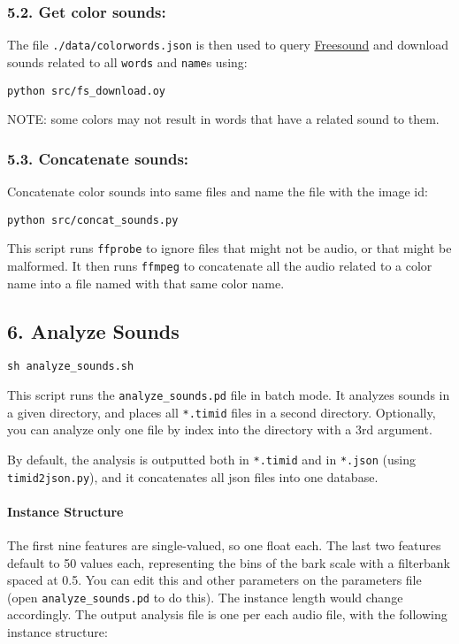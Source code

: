 \subsubsection*{5.2. Get color sounds:}

The file \texttt{./data/colorwords.json} is then used to query \href{https://freesound.org}{Freesound} and download sounds related to all \texttt{words} and \texttt{name}s using:

\texttt{python\ src/fs\_download.oy}

NOTE: some colors may not result in words that have a related sound to them.


\subsubsection*{5.3. Concatenate sounds:}

Concatenate color sounds into same files and name the file with the image id:

\texttt{python\ src/concat\_sounds.py}

This script runs \texttt{ffprobe} to ignore files that might not be audio, or that might be malformed. It then runs \texttt{ffmpeg} to concatenate all the audio related to a color name into a file named with that same color name.




\subsection*{6. Analyze Sounds}

\texttt{sh\ analyze\_sounds.sh}

This script runs the \texttt{analyze\_sounds.pd} file in batch mode. It analyzes sounds in a given directory, and places all \texttt{*.timid} files in a second directory. Optionally, you can analyze only one file by index into the directory with a 3rd argument.

By default, the analysis is outputted both in \texttt{*.timid} and in \texttt{*.json} (using \texttt{timid2json.py}), and it concatenates all \gls{json} files into one database.


\paragraph{Instance Structure}

The first nine features are single-valued, so one float each. The last two features default to 50 values each, representing the bins of the bark scale with a filterbank spaced at 0.5. You can edit this and other parameters on the parameters file (open \texttt{analyze\_sounds.pd} to do this). The instance length would change accordingly. The output analysis file is one per each audio file, with the following instance structure:

